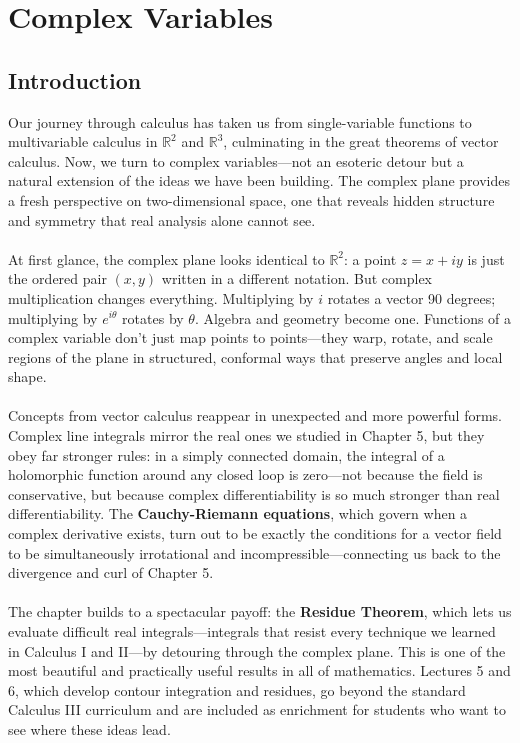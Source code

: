 
\chapter{Complex Variables}
\section*{Introduction}
Our journey through calculus has taken us from single-variable functions to multivariable calculus in \( \mathbb{R}^2 \) and \( \mathbb{R}^3 \), culminating in the great theorems of vector calculus. Now, we turn to complex variables---not an esoteric detour but a natural extension of the ideas we have been building. The complex plane provides a fresh perspective on two-dimensional space, one that reveals hidden structure and symmetry that real analysis alone cannot see.\\ \\
\noindent At first glance, the complex plane looks identical to \( \mathbb{R}^2 \): a point \( z = x + iy \) is just the ordered pair \( (x, y) \) written in a different notation. But complex multiplication changes everything. Multiplying by \( i \) rotates a vector 90 degrees; multiplying by \( e^{i\theta} \) rotates by \( \theta \). Algebra and geometry become one. Functions of a complex variable don’t just map points to points---they warp, rotate, and scale regions of the plane in structured, conformal ways that preserve angles and local shape.\\ \\
\noindent Concepts from vector calculus reappear in unexpected and more powerful forms. Complex line integrals mirror the real ones we studied in Chapter 5, but they obey far stronger rules: in a simply connected domain, the integral of a holomorphic function around any closed loop is zero---not because the field is conservative, but because complex differentiability is so much stronger than real differentiability. The \textbf{Cauchy-Riemann equations}, which govern when a complex derivative exists, turn out to be exactly the conditions for a vector field to be simultaneously irrotational and incompressible---connecting us back to the divergence and curl of Chapter 5.\\ \\
\noindent The chapter builds to a spectacular payoff: the \textbf{Residue Theorem}, which lets us evaluate difficult real integrals---integrals that resist every technique we learned in Calculus I and II---by detouring through the complex plane. This is one of the most beautiful and practically useful results in all of mathematics. Lectures 5 and 6, which develop contour integration and residues, go beyond the standard Calculus III curriculum and are included as enrichment for students who want to see where these ideas lead.



